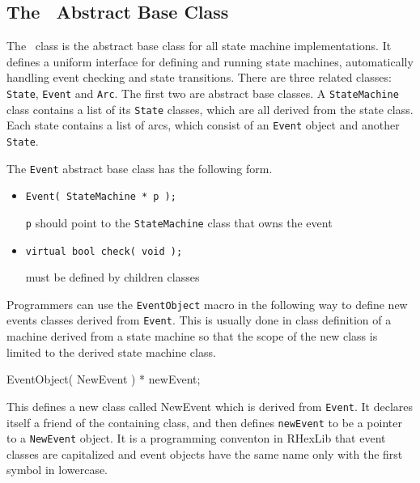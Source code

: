 \subsection{The \StateMachine\ Abstract Base Class}

The \StateMachine\ class is the abstract base class for all state machine
implementations. It defines a uniform interface for defining and running
state machines, automatically handling event checking and state
transitions. There are three related classes: {\tt State}, {\tt Event} and
{\tt Arc}. The first two are abstract base classes. A {\tt StateMachine}
class contains a list of its {\tt State} classes, which are all derived from
the state class. Each state contains a list of arcs, which consist of an
{\tt Event} object and another {\tt State}.

The {\tt Event} abstract base class has the following form.

\begin{moduleheader}
 \mline
{} \mline
\end{moduleheader}

\constructors

\begin{itemize}
\item {\tt Event( StateMachine * p );}\par
{\tt p} should point to the {\tt StateMachine} class that owns the event
\end{itemize}

\localinterface

\begin{itemize}
\item{\tt virtual bool check( void );} \par
must be defined by children classes
\end{itemize}

\noindent Programmers can use the {\tt EventObject} macro in the following
way to define new events classes derived from {\tt Event}. This is usually
done in class definition of a machine derived from a state machine so that
the scope of the new class is limited to the derived state machine class.

\begin{codesegment}
  EventObject( NewEvent ) * newEvent;
\end{codesegment}

\noindent This defines a new class called NewEvent which is derived from
{\tt Event}. It declares itself a friend of the containing class, and then
defines {\tt newEvent} to be a pointer to a {\tt NewEvent} object. It is a
programming conventon in RHexLib that event classes are capitalized and
event objects have the same name only with the first symbol in lowercase.

